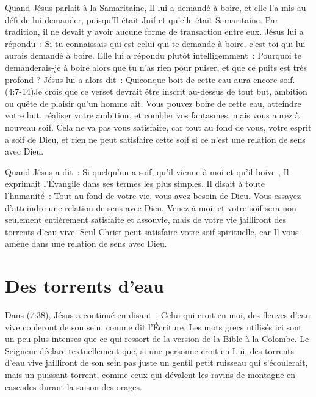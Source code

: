 Quand Jésus parlait à la Samaritaine, Il lui a demandé à boire,
 et elle l'a mis au défi de lui demander, puisqu'Il était Juif
 et qu'elle était Samaritaine. Par tradition, il ne devait y avoir
 aucune forme de transaction entre eux. Jésus lui a répondu~:
 \og Si tu connaissais qui est celui qui te demande à boire,
 c'est toi qui lui aurais demandé à boire. \fg{}
 Elle lui a répondu plutôt intelligemment~:
 \og Pourquoi te demanderais-je à boire alors que tu n'as rien pour puiser,
 et que ce puits est très profond ? \fg{} Jésus lui a alors dit~:
 \og Quiconque boit de cette eau aura encore soif. \fg{}
 (4:7-14)Je crois que ce verset devrait être inscrit
 au-dessus de tout but,
 ambition ou quête de plaisir qu'un homme ait.
 Vous pouvez boire de cette eau, atteindre votre but, réaliser votre ambition,
 et combler vos fantasmes, mais vous aurez à nouveau soif.
 Cela ne va pas vous satisfaire, car tout au fond de vous,
 votre esprit a soif de Dieu, et rien ne peut satisfaire cette soif
 si ce n'est une relation de sens avec Dieu.

Quand Jésus a dit~: \og Si quelqu'un a soif, qu'il vienne à moi
 et qu'il boive \fg{}, Il exprimait l'Évangile dans ses termes
 les plus simples. Il disait à toute l'humanité~:
 \og Tout au fond de votre vie, vous avez besoin de Dieu.
 Vous essayez d'atteindre une relation de sens avec Dieu.
 Venez à moi, et votre soif sera non seulement entièrement satisfaite
 et assouvie, mais de votre vie jailliront des torrents d'eau vive. \fg{}
 Seul Christ peut satisfaire votre soif spirituelle,
 car Il vous amène dans une relation de sens avec Dieu.


\section{Des torrents d'eau}

Dans (7:38), Jésus a continué en disant~:
 \og Celui qui croit en moi, des fleuves d'eau vive couleront de son sein,
 comme dit l'Écriture. \fg{}
 Les mots grecs utilisés ici sont un peu plus intenses que ce qui ressort
 de la version de la Bible à la Colombe. Le Seigneur déclare textuellement
 que, si une personne croit en Lui, \og des torrents d'eau vive jailliront
 de son sein \fg{} \ocadr pas juste un gentil petit ruisseau qui s'écoulerait,
 mais un puissant torrent, comme ceux qui dévalent les ravins de montagne
 en cascades durant la saison des orages.

